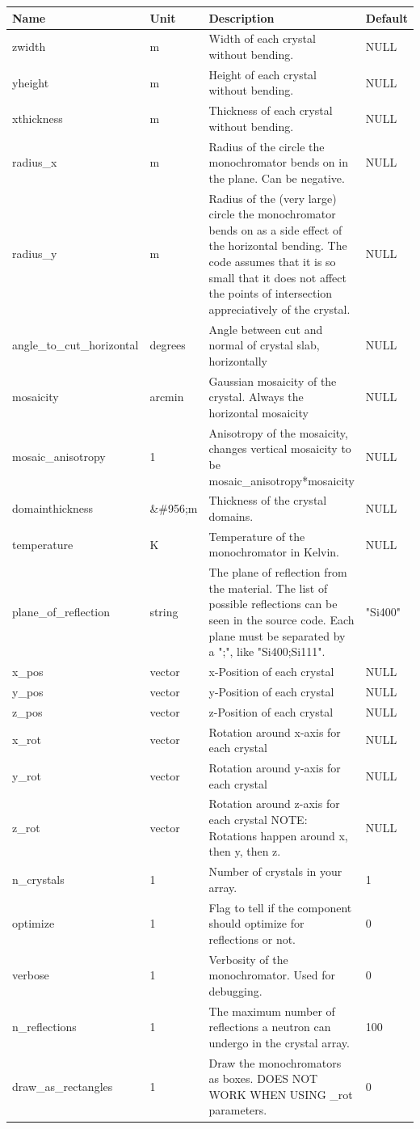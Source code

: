 \begin{longtable}{p{}p{}p{}p{}}
\toprule
\textbf{Name} & \textbf{Unit} & \textbf{Description} & \textbf{Default} \\
\midrule
\endhead
zwidth & m & Width of each crystal without bending. & NULL \\
yheight & m & Height of each crystal without bending. & NULL \\
xthickness & m & Thickness of each crystal without bending. & NULL \\
radius\_x & m & Radius of the circle the monochromator bends on in the plane. Can be negative. & NULL \\
radius\_y & m & Radius of the (very large) circle the monochromator bends on as a side effect of the horizontal bending. The code assumes that it is so small that it does not affect the points of intersection appreciatively of the crystal. & NULL \\
angle\_to\_cut\_horizontal & degrees & Angle between cut and normal of crystal slab, horizontally & NULL \\
mosaicity & arcmin & Gaussian mosaicity of the crystal. Always the horizontal mosaicity & NULL \\
mosaic\_anisotropy & 1 & Anisotropy of the mosaicity, changes vertical mosaicity to be mosaic\_anisotropy*mosaicity & NULL \\
domainthickness & \&\#956;m & Thickness of the crystal domains. & NULL \\
temperature & K & Temperature of the monochromator in Kelvin. & NULL \\
plane\_of\_reflection & string & The plane of reflection from the material. The list of possible reflections can be seen in the source code. Each plane must be separated by a ";", like "Si400;Si111". & "Si400" \\
x\_pos & vector & x-Position of each crystal & NULL \\
y\_pos & vector & y-Position of each crystal & NULL \\
z\_pos & vector & z-Position of each crystal & NULL \\
x\_rot & vector & Rotation around x-axis for each crystal & NULL \\
y\_rot & vector & Rotation around y-axis for each crystal & NULL \\
z\_rot & vector & Rotation around z-axis for each crystal NOTE: Rotations happen around x, then y, then z. & NULL \\
n\_crystals & 1 & Number of crystals in your array. & 1 \\
optimize & 1 & Flag to tell if the component should optimize for reflections or not. & 0 \\
verbose & 1 & Verbosity of the monochromator. Used for debugging. & 0 \\
n\_reflections & 1 & The maximum number of reflections a neutron can undergo in the crystal array. & 100 \\
draw\_as\_rectangles & 1 & Draw the monochromators as boxes. DOES NOT WORK WHEN USING \_rot parameters. & 0 \\
\bottomrule
\end{longtable}

